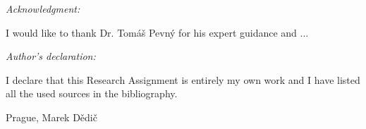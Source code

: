 \noindent \textit{\Large Acknowledgment:}

\noindent I would like to thank Dr. Tomáš Pevný for his expert guidance and ...

\vfill

\noindent \textit{\Large Author's declaration:}

\noindent I declare that this Research Assignment is entirely my own work and I have listed all the used sources in the bibliography.

\bigskip

\noindent Prague, \documentdate\hfill Marek Dědič

\vspace{2cm}
